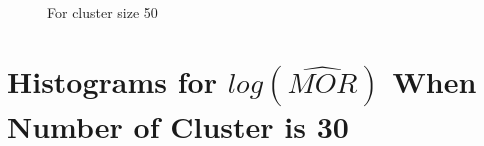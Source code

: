 \documentclass[
  letterpaper,
  DIV=11,
  numbers=noendperiod,
  titlepage]{scrartcl}
\begin{document}
\begin{figure}
\begin{minipage}[t]{0.50\linewidth}
{{}

\caption{For cluster size 50}

}

\end{minipage}%

\end{figure}

\newpage

\hypertarget{histograms-for-logwidehatmor-when-number-of-cluster-is-30}{%
\section{\texorpdfstring{Histograms for \(log(\widehat{MOR})\) When
Number of Cluster is
30}{Histograms for log(\textbackslash widehat\{MOR\}) When Number of Cluster is 30}}\label{histograms-for-logwidehatmor-when-number-of-cluster-is-30}}

\vspace{5mm}
\end{document}
